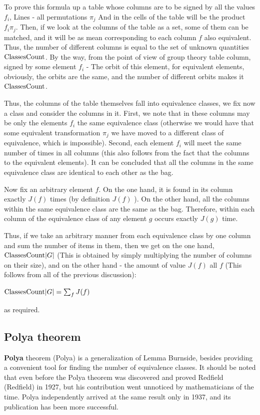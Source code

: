 To prove this formula up a table whose columns are to be signed by all the values $f_i$, Lines - all permutations $\pi_j$ And in the cells of the table will be the product $f_i \pi_j$. Then, if we look at the columns of the table as a set, some of them can be matched, and it will be as mean corresponding to each column $f$ also equivalent. Thus, the number of different columns is equal to the set of unknown quantities $\rm ClassesCount$. By the way, from the point of view of group theory table column, signed by some element $f_i$ - The orbit of this element, for equivalent elements, obviously, the orbits are the same, and the number of different orbits makes it $\rm ClassesCount$.

Thus, the columns of the table themselves fall into equivalence classes, we fix now a class and consider the columns in it. First, we note that in these columns may be only the elements $f_i$ the same equivalence class (otherwise we would have that some equivalent transformation $\pi_j$ we have moved to a different class of equivalence, which is impossible). Second, each element $f_i$ will meet the same number of times in all columns (this also follows from the fact that the columns to the equivalent elements). It can be concluded that all the columns in the same equivalence class are identical to each other as the bag.

Now fix an arbitrary element $f$. On the one hand, it is found in its column exactly $J (f)$ times (by definition $J (f)$ ). On the other hand, all the columns within the same equivalence class are the same as the bag. Therefore, within each column of the equivalence class of any element $g$ occurs exactly $J (g)$ time.

Thus, if we take an arbitrary manner from each equivalence class by one column and sum the number of items in them, then we get on the one hand, ${\rm ClassesCount} | G |$ (This is obtained by simply multiplying the number of columns on their size), and on the other hand - the amount of value $J (f)$ all $f$ (This follows from all of the previous discussion):

${\rm ClassesCount} | G | = \sum_ {f} J (f)$

as required.

\subsection{ Polya theorem }

\textbf{Polya} theorem (Polya) is a generalization of Lemma Burnside, besides providing a convenient tool for finding the number of equivalence classes. It should be noted that even before the Polya theorem was discovered and proved Redfield (Redfield) in 1927, but his contribution went unnoticed by mathematicians of the time. Polya independently arrived at the same result only in 1937, and its publication has been more successful.

